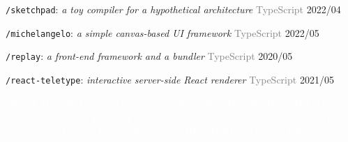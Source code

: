 \documentclass[10pt]{article}
\begin{document}
\vspace{0.5em}
\texttt{/sketchpad}: \textit{a toy compiler for a hypothetical architecture} \hfill \textcolor{gray}{TypeScript} 2022/04

\vspace{0.5em}
\texttt{/michelangelo}: \textit{a simple canvas-based UI framework} \hfill \textcolor{gray}{TypeScript}  2022/05

\vspace{0.5em}
\texttt{/replay}: \textit{a front-end framework and a bundler} \hfill \textcolor{gray}{TypeScript} 2020/05

\vspace{0.5em}
\texttt{/react-teletype}: \textit{interactive server-side React renderer} \hfill \textcolor{gray}{TypeScript} 2021/05

\vspace{2em}
\textcolor{white}{OCaml, Haskell, Python, OpenCV, NumPy, SciPy,  MySQL, MongoDB, Java, PHP, Express, Vue, jQuery, Parcel, Sass/LESS, Bootstrap, Ant Design, styled-components, Linaria, D3.js, SWR, Socket.IO, WebRTC, Tailwind CSS}
\end{document}
